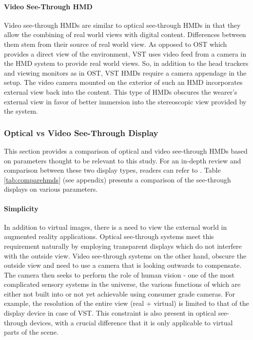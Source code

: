 \paragraph{Video See-Through HMD}
Video see-through HMDs are similar to optical see-through HMDs in that they allow the combining of real world views with digital content. Differences between them stem from their source of real world view. As opposed to OST which provides a direct view of the environment, VST uses video feed from a camera in the HMD system to provide real world views. So, in addition to the head trackers and viewing monitors as in OST, VST HMDs require a camera appendage in the setup. The video camera mounted on the exterior of such an HMD incorporates external view back into the content. This type of HMDs obscures the wearer's external view in favor of better immersion into the stereoscopic view provided by the system. 

\subsubsection{Optical vs Video See-Through Display}
\label{sec:ostvsvst}
This section provides a comparison of optical and video see-through HMDs based on parameters thought to be relevant to this study. For an in-depth review and comparison between these two display types, readers can refer to \cite{rolland1995comparison}. Table \ref{tab:comparehmds} (see appendix) presents a comparison of the see-through displays on various parameters.


\paragraph{Simplicity} 
In addition to virtual images, there is a need to view the external world in augmented reality applications. Optical see-through systems meet this requirement naturally by employing transparent displays which do not interfere with the outside view. Video see-through systems on the other hand, obscure the outside view and need to use a camera that is looking outwards to compensate. The camera then seeks to perform the role of human vision - one of the most complicated sensory systems in the universe, the various functions of which are either not built into or not yet achievable using consumer grade cameras. For example, the resolution of the entire view (real + virtual) is limited to that of the display device in case of VST. This constraint is also present in optical see-through devices, with a crucial difference that it is only applicable to virtual parts of the scene. 
	
